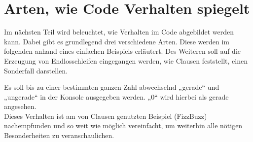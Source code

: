 \chapter{Arten, wie Code Verhalten spiegelt}
Im nächsten Teil wird beleuchtet, wie Verhalten im Code abgebildet werden kann. Dabei gibt es grundlegend drei verschiedene Arten. Diese werden im folgenden anhand eines einfachen Beispiels erläutert. Des Weiteren soll auf die Erzeugung von Endlosschleifen eingegangen werden, wie Clausen feststellt, einen Sonderfall darstellen. \cite{fiveLines.2023}
\begin{tcolorbox}[colback=gray!20!white, colframe=gray!75!black, title=Beispielverhalten]
    Es soll bis zu einer bestimmten ganzen Zahl abwechselnd „gerade“ und „ungerade“ in der Konsole ausgegeben werden. „0“ wird hierbei als gerade angesehen.\\
    Dieses Verhalten ist am von Clausen genutzten Beispiel (FizzBuzz) nachempfunden und so weit wie möglich vereinfacht, um weiterhin alle nötigen Besonderheiten zu veranschaulichen.\cite{fiveLines.2023}
\end{tcolorbox}

